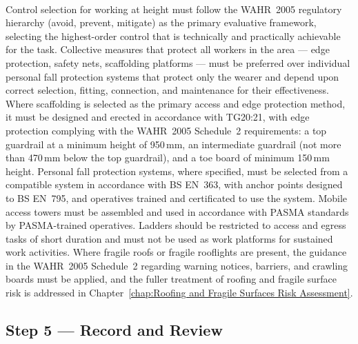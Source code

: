 \paragraph{}
Control selection for working at height must follow the WAHR~2005 regulatory hierarchy (avoid, prevent, mitigate) as the primary evaluative framework, selecting the highest-order control that is technically and practically achievable for the task. Collective measures that protect all workers in the area --- edge protection, safety nets, scaffolding platforms --- must be preferred over individual personal fall protection systems that protect only the wearer and depend upon correct selection, fitting, connection, and maintenance for their effectiveness. Where scaffolding is selected as the primary access and edge protection method, it must be designed and erected in accordance with TG20:21, with edge protection complying with the WAHR~2005 Schedule~2 requirements: a top guardrail at a minimum height of 950\,mm, an intermediate guardrail (not more than 470\,mm below the top guardrail), and a toe board of minimum 150\,mm height. Personal fall protection systems, where specified, must be selected from a compatible system in accordance with BS EN~363, with anchor points designed to BS EN~795, and operatives trained and certificated to use the system. Mobile access towers must be assembled and used in accordance with PASMA standards by PASMA-trained operatives. Ladders should be restricted to access and egress tasks of short duration and must not be used as work platforms for sustained work activities. Where fragile roofs or fragile rooflights are present, the guidance in the WAHR~2005 Schedule~2 regarding warning notices, barriers, and crawling boards must be applied, and the fuller treatment of roofing and fragile surface risk is addressed in Chapter~\ref{chap:Roofing and Fragile Surfaces Risk Assessment}.

\subsection{Step 5 --- Record and Review}

